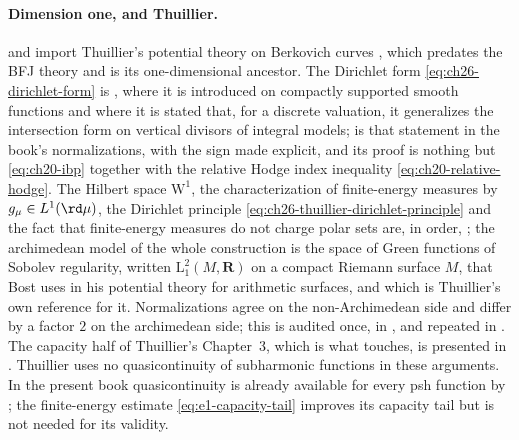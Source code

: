 \paragraph{Dimension one, and Thuillier.}
 and  import
Thuillier's potential theory on Berkovich curves \cite{Thu05}, which
predates the BFJ theory and is its one-dimensional ancestor.  The Dirichlet
form \eqref{eq:ch26-dirichlet-form} is \cite[\S3.5]{Thu05}, where it is
introduced on compactly supported smooth functions and where it is stated
that, for a discrete valuation, it generalizes the intersection form on
vertical divisors of integral models;
 is that statement in the book's
normalizations, with the sign made explicit, and its proof is nothing but
\eqref{eq:ch20-ibp} together with the relative Hodge index inequality
\eqref{eq:ch20-relative-hodge}.  The Hilbert space $\mathrm W^1$, the
characterization of finite-energy measures by
$g_\mu\in L^1(\rd\mu)$, the Dirichlet principle
\eqref{eq:ch26-thuillier-dirichlet-principle} and the fact that
finite-energy measures do not charge polar sets are, in order,
\cite[Proposition~3.5.2, Lemma~3.5.3, Propositions~3.5.7, 3.5.9, 3.5.10 and
Th\'eor\`eme~3.5.11]{Thu05}; the archimedean model of the whole construction
is the space of Green functions of Sobolev regularity, written
$\mathrm L^2_1(M,\mathbf R)$ on a compact Riemann surface $M$, that
Bost uses in his potential theory for arithmetic surfaces, and which is
Thuillier's own reference for it.
Normalizations agree on the non-Archimedean side and differ by a factor
$2$ on the archimedean side; this is audited once, in
, and repeated in
.  The capacity half of Thuillier's
Chapter~3, which is what  touches, is presented in
.  Thuillier uses no quasicontinuity of
subharmonic functions in these arguments.  In the present book
quasicontinuity is already available for every psh function by
; the finite-energy estimate
\eqref{eq:e1-capacity-tail} improves its capacity tail but is not needed for
its validity.

